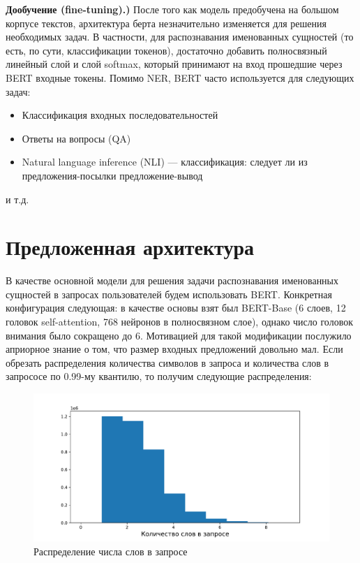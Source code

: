 \documentclass[12pt,a4paper]{article}
\begin{document}
\textbf{Дообучение (fine-tuning).)} После того как модель предобучена на большом корпусе текстов, архитектура берта незначительно изменяется для решения необходимых задач. В частности, для распознавания именованных сущностей (то есть, по сути, классификации токенов), достаточно добавить полносвязный линейный слой и слой softmax, который принимают на вход прошедшие через BERT входные токены. Помимо NER, BERT часто используется для следующих задач:
\begin{itemize}
    \item Классификация входных последовательностей
    \item Ответы на вопросы (QA)
    \item Natural language inference (NLI) --- классификация: следует ли из предложения-посылки предложение-вывод
\end{itemize}
\noindent и т.д.

\section{Предложенная архитектура}

В качестве основной модели для решения задачи распознавания именованных сущностей в запросах пользователей будем использовать BERT. Конкретная конфигурация следующая: в качестве основы взят был BERT-Base (6 слоев, 12 головок self-attention, 768 нейронов в полносвязном слое), однако число головок внимания было сокращено до 6. Мотивацией для такой модификации послужило априорное знание о том, что размер входных предложений довольно мал. Если обрезать распределения количества символов в запроса и количества слов в запрососе по 0.99-му квантилю, то получим следующие распределения:

\begin{figure}[H]
	\begin{center}
		\includegraphics[scale=0.4]{nwords.pdf}
	\end{center}
	\caption{Распределение числа слов в запросе}
\end{figure}
\end{document}

